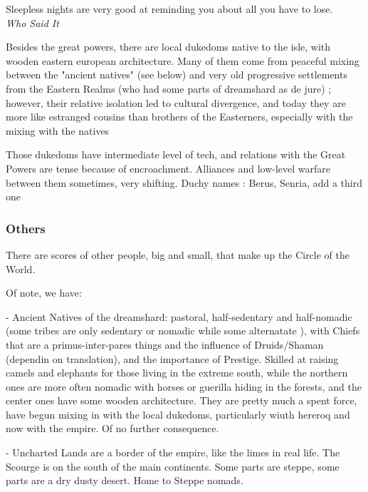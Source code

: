 \begin{rpg-quotebox}
    Sleepless nights are very good at reminding you about all you have to lose. \\ \textendash \textit{Who Said It}
\end{rpg-quotebox}

Besides the great powers, there are local dukedoms native to the isle, with wooden eastern european architecture. 
Many of them come from peaceful mixing between the "ancient natives" (see below) and very old progressive settlements from the Eastern Realms (who had some parts of dreamshard as de jure) ; however, their relative isolation led to cultural divergence, and today they are more like estranged cousins than brothers of the Easterners, especially with the mixing with the natives


Those dukedoms have intermediate level of tech, and relations with the Great Powers are tense because of encroachment. Alliances and low-level warfare between them sometimes, very shifting.
	Duchy names : Berus, Senria, add a third one

\subsubsection{Others}

There are scores of other people, big and small, that make up the Circle of the World.

Of note, we have:

- Ancient Natives of the dreamshard: pastoral, half-sedentary and half-nomadic (some tribes are only sedentary or nomadic while some alternatate ), with Chiefs that are a primus-inter-pares things and the influence of Druids/Shaman (dependin on translation), and the importance of Prestige. Skilled at raising camels and elephants for those living in the extreme south, while the northern ones are more often nomadic with horses or guerilla hiding in the forests, and the center ones have some wooden architecture. They are pretty much a spent force, have begun mixing in with the local dukedoms, particularly wiuth hereroq and now with the empire. Of no further consequence.

- Uncharted Lands are a border of the empire, like the limes in real life.
The Scourge is on the south of the main continents. Some parts are steppe, some parts are a dry dusty desert. Home to Steppe nomads.







